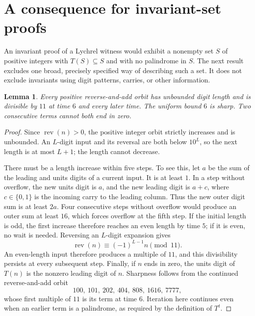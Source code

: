 \documentclass[11pt]{article}
\newtheorem{lemma}[theorem]{Lemma}
\newcommand{\rev}{\operatorname{rev}}
\begin{document}
\section{A consequence for invariant-set proofs}
An invariant proof of a Lychrel witness would exhibit a nonempty set
$S$ of positive integers with $T(S)\subseteq S$ and with no palindrome
in $S$. The next result excludes one broad, precisely specified way of
describing such a set. It does not exclude invariants using digit patterns,
carries, or other information.

\begin{lemma}\label{lem:orbit}
Every positive reverse-and-add orbit has unbounded digit length and is
divisible by $11$ at time $6$ and every later time. The uniform bound $6$
is sharp. Two consecutive terms cannot both end in zero.
\end{lemma}
\begin{proof}
Since $\rev(n)>0$, the positive integer orbit strictly increases and is
unbounded. An $L$-digit input and its reversal are both below $10^L$, so
the next length is at most $L+1$; the length cannot decrease.

There must be a length increase within five steps. To see this, let $a$
be the sum of the leading and units digits of a current input. It is
at least $1$. In a step without overflow, the new units digit is $a$,
and the new leading digit is $a+c$, where $c\in\{0,1\}$ is the incoming
carry to the leading column. Thus the new outer digit sum is at least
$2a$. Four consecutive steps without overflow would produce an outer
sum at least $16$, which forces overflow at the fifth step. If the
initial length is odd, the first increase therefore reaches an even
length by time $5$; if it is even, no wait is needed. Reversing an
$L$-digit expansion gives
\[
 \rev(n)\equiv(-1)^{L-1}n\pmod {11}.
\]
An even-length input therefore produces a multiple of $11$, and this
divisibility persists at every subsequent step. Finally, if $n$ ends in
zero, the units digit of $T(n)$ is the nonzero leading digit of $n$.
Sharpness follows from the continued reverse-and-add orbit
\[
100,\ 101,\ 202,\ 404,\ 808,\ 1616,\ 7777,
\]
whose first multiple of $11$ is its term at time $6$. Iteration here
continues even when an earlier term is a palindrome, as required by the
definition of $T^t$.
\end{proof}
\end{document}
